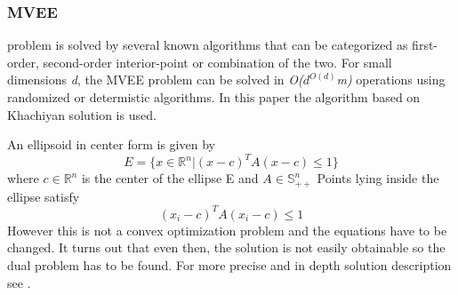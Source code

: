 \documentclass{llncs}
\begin{document}

\subsubsection{MVEE}

problem is solved by several known algorithms that can be categorized as first-order, second-order interior-point or combination of the two. For small dimensions \textit{d}, the MVEE problem can be solved in \textit{O($d^{O(d)}$m)} operations using randomized or determistic algorithms\cite{MVEEMichaelTodd2005}. In this paper the algorithm based on Khachiyan solution is used.

\noindent An ellipsoid in center form is given by \[ E = \{x \in \mathbb{R}^{n} | (x - c)^{T}A(x-c) \le 1\} \] where $c \in \mathbb{R}^{n}$ is the center of the ellipse E and $ A \in \mathbb{S}^{n}_{++}$ Points lying inside the ellipse satisfy \[ (x_{i} - c)^{T}A(x_{i} - c) \le 1 \] However this is not a convex optimization problem and the equations have to be changed. It turns out that even then, the solution is not easily obtainable so the dual problem has to be found. For more precise and in depth solution description see \cite{MVEEMichaelTodd2005}.
\end{document}
